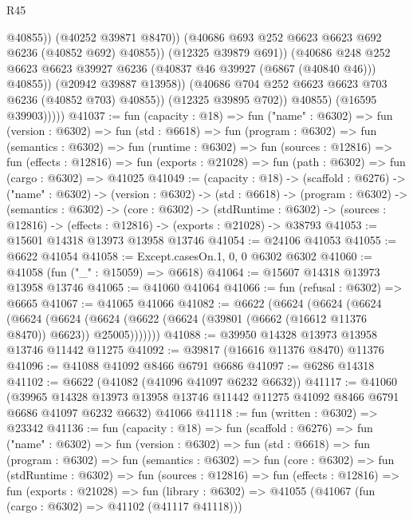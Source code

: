 \begin{lexlean}{R45}
\begin{coremodule}
{                                @40855))
                            (@40252 @39871 @8470))
                          (@40686 @693 @252 @6623 @6623 @692 @6236 (@40852 @692) @40855))
                        (@12325 @39879 @691))
                      (@40686
                        @248
                        @252
                        @6623
                        @6623
                        @39927
                        @6236
                        (@40837 @46 @39927 (@6867 (@40840 @46)))
                        @40855))
                    (@20942 @39887 @13958))
                  (@40686 @704 @252 @6623 @6623 @703 @6236 (@40852 @703) @40855))
                (@12325 @39895 @702))
              @40855)
            (@16595 @39903)))))
@41037 := fun (capacity : @18) =>
  fun ("name" : @6302) =>
  fun (version : @6302) =>
  fun (std : @6618) =>
  fun (program : @6302) =>
  fun (semantics : @6302) =>
  fun (runtime : @6302) =>
  fun (sources : @12816) =>
  fun (effects : @12816) =>
  fun (exports : @21028) => fun (path : @6302) => fun (cargo : @6302) => @41025
@41049 := (capacity : @18) ->
  (scaffold : @6276) ->
  ("name" : @6302) ->
  (version : @6302) ->
  (std : @6618) ->
  (program : @6302) ->
  (semantics : @6302) ->
  (core : @6302) ->
  (stdRuntime : @6302) -> (sources : @12816) -> (effects : @12816) -> (exports : @21028) -> @38793
@41053 := @15601 @14318 @13973 @13958 @13746
@41054 := @24106 @41053
@41055 := @6622 @41054
@41058 := Except.casesOn.{1, 0, 0} @6302 @6302
@41060 := @41058 (fun ("_" : @15059) => @6618)
@41064 := @15607 @14318 @13973 @13958 @13746
@41065 := @41060 @41064
@41066 := fun (refusal : @6302) => @6665
@41067 := @41065 @41066
@41082 := @6622
    (@6624
      (@6624
        (@6624
          (@6624
            (@6624 (@6624 (@6622 (@6624 (@39801 (@6662 (@16612 @11376 @8470)) @6623)) @25005)))))))
@41088 := @39950 @14328 @13973 @13958 @13746 @11442 @11275
@41092 := @39817 (@16616 @11376 @8470) @11376
@41096 := @41088 @41092 @8466 @6791 @6686
@41097 := @6286 @14318
@41102 := @6622 (@41082 (@41096 @41097 @6232 @6632))
@41117 := @41060
    (@39965 @14328 @13973 @13958 @13746 @11442 @11275 @41092 @8466 @6791 @6686 @41097 @6232 @6632)
    @41066
@41118 := fun (written : @6302) => @23342
@41136 := fun (capacity : @18) =>
  fun (scaffold : @6276) =>
  fun ("name" : @6302) =>
  fun (version : @6302) =>
  fun (std : @6618) =>
  fun (program : @6302) =>
  fun (semantics : @6302) =>
  fun (core : @6302) =>
  fun (stdRuntime : @6302) =>
  fun (sources : @12816) =>
  fun (effects : @12816) =>
  fun (exports : @21028) =>
  fun (library : @6302) => @41055 (@41067 (fun (cargo : @6302) => @41102 (@41117 @41118)))
}
\end{coremodule}
\end{lexlean}
